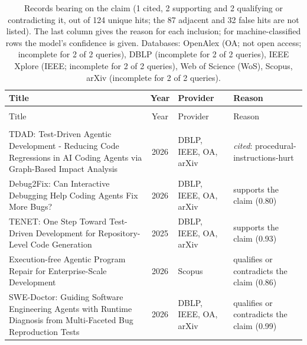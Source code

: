 
\begingroup\footnotesize
\begin{longtable}{@{}%
  >{\raggedright\arraybackslash}p{}c%
  >{\raggedright\arraybackslash}p{}%
  >{\raggedright\arraybackslash}p{}@{}}
\caption{Records bearing on the claim (1 cited, 2 supporting and 2 qualifying or contradicting it, out of 124 unique hits; the 87 adjacent and 32 false hits are not listed). The last column gives the reason for each inclusion; for machine-classified rows the model's confidence is given. Databases: OpenAlex (OA; not open access; incomplete for 2 of 2 queries), DBLP (incomplete for 2 of 2 queries), IEEE Xplore (IEEE; incomplete for 2 of 2 queries), Web of Science (WoS), Scopus, arXiv (incomplete for 2 of 2 queries).}\label{tab:t-run-tests-first}\\
\toprule
Title & Year & Provider & Reason \\
\midrule
\endfirsthead
\multicolumn{4}{@{}l}{\emph{\tablename~\thetable{} (cont.)}}\\
\toprule
Title & Year & Provider & Reason \\
\midrule
\endhead
\midrule \multicolumn{4}{r@{}}{\emph{continued on next page}}\\
\endfoot
\bottomrule
\endlastfoot
TDAD: Test-Driven Agentic Development - Reducing Code Regressions in AI Coding Agents via Graph-Based Impact Analysis & 2026 & DBLP, IEEE, OA, arXiv & \emph{cited}: procedural-instructions-hurt \\
Debug2Fix: Can Interactive Debugging Help Coding Agents Fix More Bugs? & 2026 & DBLP, IEEE, OA, arXiv & supports the claim (0.80) \\
TENET: One Step Toward Test-Driven Development for Repository-Level Code Generation & 2025 & DBLP, IEEE, OA, arXiv & supports the claim (0.93) \\
Execution-free Agentic Program Repair for Enterprise-Scale Development & 2026 & Scopus & qualifies or contradicts the claim (0.86) \\
SWE-Doctor: Guiding Software Engineering Agents with Runtime Diagnosis from Multi-Faceted Bug Reproduction Tests & 2026 & DBLP, IEEE, OA, arXiv & qualifies or contradicts the claim (0.99) \\
\end{longtable}
\endgroup
